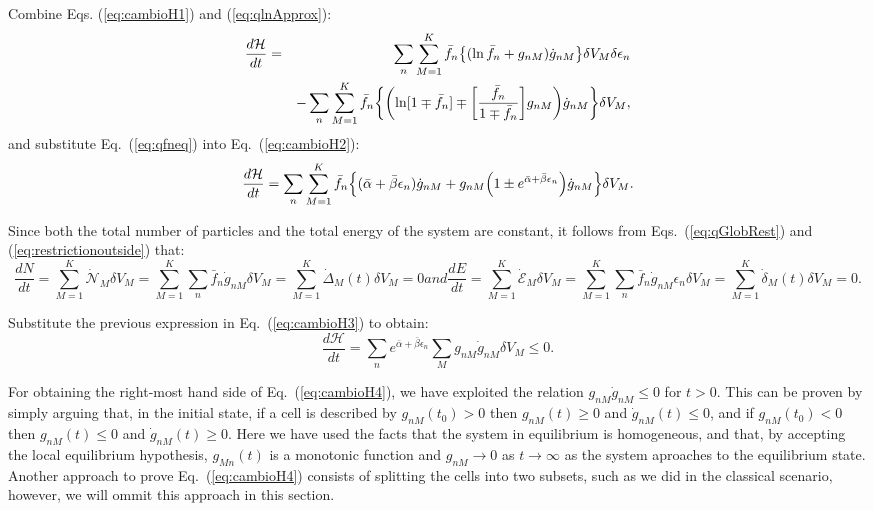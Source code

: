 Combine Eqs. (\ref{eq:cambioH1}) and (\ref{eq:qlnApprox}):
%
\begin{eqnarray}\label{eq:cambioH2}
    \frac{d\mathcal{H}}{dt}&=&\sum_n \sum_{M=1}^{K} \bar{f}_n\left \{ (\ln \bar{f}_n+ g_{nM})\dot{g}_{nM}\right\} \de V_M \delta \epsilon_n \nonumber \\
    &&-\sum_{n}\sum_{M=1}^{K}\bar f_n\left\{ \left( \ln[1\mp\bar{f}_n]\mp \left[\frac{\bar{f}_n}{1\mp\bar{f}_n} \right] g_{nM}\right)\dot{g}_{nM} \right \}\de V_M,
\end{eqnarray}
%
and substitute Eq.~(\ref{eq:qfneq}) into Eq.~(\ref{eq:cambioH2}):
%
\begin{equation}\label{eq:cambioH3}
    \frac{d\mathcal{H}}{dt}=
       \sum_n \sum_{M=1}^{K} \bar{f}_n\left \{
          (\bar{\alpha}+\bar{\beta}{\epsilon}_n)\dot{g}_{nM}
           +g_{nM}\left(1\pm e^{\bar{\alpha}+\bar{\beta}{\epsilon}_n}\right)\dot{g}_{nM}
       \right \} \de V_M.
\end{equation}
%

Since both the total number of particles and the total energy of the system are constant, it follows
from Eqs.~(\ref{eq:qGlobRest}) and (\ref{eq:restrictionoutside}) that:
%
\begin{subequations}
\begin{equation}
\frac{dN}{dt}=\sum_{M=1}^K\dot{\mathcal{N}}_M\delta V_M
   =\sum_{M=1}^K\sum_n \bar{f}_n \dot{g}_{nM}\delta V_M=\sum_{M=1}^K\dot{\Delta}_M(t)\delta V_M=0
\end{equation}
%
and
%
\begin{equation}
\frac{dE}{dt}=\sum_{M=1}^K\dot{\mathcal{E}}_M\delta V_M
   =\sum_{M=1}^K\sum_n \bar{f}_n \dot{g}_{nM}\epsilon_n\delta V_M=\sum_{M=1}^K\dot{\delta}_M(t)\delta V_M=0.
\end{equation}
\end{subequations}
%

Substitute the previous expression in Eq.~(\ref{eq:cambioH3}) to obtain:
%
\begin{equation}\label{eq:cambioH4}
   \frac{d\mathcal{H}}{dt}=\sum_n e^{\bar{\alpha}+\bar{\beta}\epsilon_n}
   \sum_M  g_{nM}\dot{g}_{nM} \delta V_M \leq 0.
\end{equation}
%

For obtaining the right-most hand side of Eq.~(\ref{eq:cambioH4}), 
we have exploited the relation $g_{nM}\dot{g}_{nM}\leq0$ for $t>0$. This can be proven 
by simply arguing that, in the initial
state, if a cell is described by $g_{nM}(t_0)>0$ then $g_{nM}(t)\geq0$ and $\dot g_{nM}(t)\leq0$, and if
$g_{nM}(t_0)<0$ then $g_{nM}(t)\leq0$ and $\dot g_{nM}(t)\geq0$. Here we have used the facts that
the system in equilibrium is homogeneous, and that, by accepting the local equilibrium hypothesis, $g_{Mn}(t)$
is a monotonic function and $g_{nM}\to0$ as $t\to\infty$ as the system aproaches to the equilibrium state.
Another approach to prove Eq.~(\ref{eq:cambioH4}) consists of splitting the cells into two subsets,
such as we did in the classical scenario, however, we will ommit this approach in this section.

